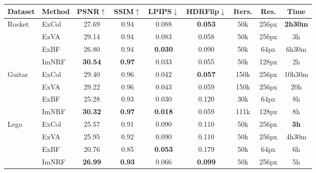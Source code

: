 \begingroup
\begin{table*}[!htb]
    \centering
    \begin{tabular*}{\textwidth}{ l | l | c c c c | c c c }
        Dataset & Method & PSNR$\uparrow$ & SSIM$\uparrow$ & LPIPS$\downarrow$ & HDRFlip$\downarrow$ & Iters. & Res. & Time \\
        \midrule
        
        \multirow{4}{*}{Rocket}
        & ExCol & 27.69 & 0.94 & 0.088 & \textbf{0.053} & 50k & 256px & \textbf{2h30m} \\
        & ExVA & 29.14 & 0.94 & 0.083 & 0.058 & 50k & 256px & 3h \\
        & ExBF & 26.80 & 0.94 & \textbf{0.030} & 0.090 & 50k & \color{gray}64px & \color{gray}6h30m \\
        & ImNRF & \textbf{30.54} & \textbf{0.97} & 0.033 & 0.055 & 50k & \color{burgundy}128px & \color{burgundy}2h \\
        \midrule
        
        \multirow{4}{*}{Guitar}
        & ExCol & 29.40 & 0.96 & 0.042 & \textbf{0.057} & 150k & 256px & 10h30m \\
        & ExVA & 29.22 & 0.96 & 0.043 & 0.059 & 150k & 256px & 20h \\
        & \color{gray}ExBF & \color{gray}25.28 & \color{gray}0.93 & \color{gray}0.030 & \color{gray}0.120 & \color{gray}30k & \color{gray}64px & \color{gray}8h \\
        & ImNRF & \textbf{30.32} & \textbf{0.97} & \textbf{0.018} & 0.059 & 111k & \color{burgundy}128px & \color{burgundy}8h \\
        \midrule
        
        \multirow{4}{*}{Lego}
        & ExCol & 25.57 & 0.91 & 0.090 & 0.110 & 50k & 256px & \textbf{3h} \\
        & ExVA & 25.95 & 0.92 & 0.090 & 0.110 & 50k & 256px & 4h30m \\
        & ExBF & 20.76 & 0.85 & \textbf{0.053} & 0.179 & 50k & \color{gray}64px & \color{gray}6h \\
        & ImNRF & \textbf{26.99} & \textbf{0.93} & 0.066 & \textbf{0.099} & 50k & 256px & 5h \\
        \midrule
        

\end{tabular*}
\end{table*}
